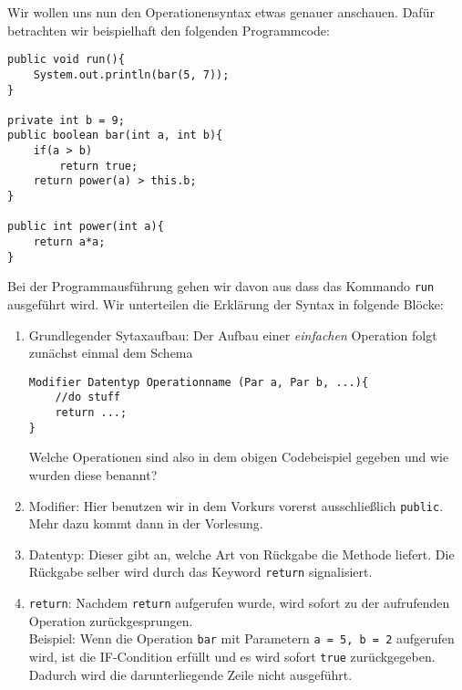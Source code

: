 \begin{Infobox}[Operationensyntax]
    Wir wollen uns nun den Operationensyntax etwas genauer anschauen. 
    Dafür betrachten wir beispielhaft den folgenden Programmcode:

    \begin{lstlisting}[breaklines=true, numbers=none]
public void run(){
    System.out.println(bar(5, 7));
}

private int b = 9;
public boolean bar(int a, int b){
    if(a > b)
        return true;
    return power(a) > this.b;
}

public int power(int a){
    return a*a;
}
    \end{lstlisting}

    Bei der Programmausführung gehen wir davon aus dass das Kommando \lstinline{run} ausgeführt wird. 
    Wir unterteilen die Erklärung der Syntax in folgende Blöcke:

    \begin{enumerate}[label=\roman*)]
        \item Grundlegender Sytaxaufbau: 
            Der Aufbau einer \textit{einfachen} Operation folgt zunächst einmal dem Schema 

            \begin{lstlisting}
Modifier Datentyp Operationname (Par a, Par b, ...){
    //do stuff
    return ...;
}
            \end{lstlisting}

            Welche Operationen sind also in dem obigen Codebeispiel gegeben und wie wurden diese benannt?
        \item Modifier: 
            Hier benutzen wir in dem Vorkurs vorerst ausschließlich \lstinline{public}. 
            Mehr dazu kommt dann in der Vorlesung.
        \item Datentyp: 
            Dieser gibt an, welche Art von Rückgabe die Methode liefert. 
            Die Rückgabe selber wird durch das Keyword \lstinline{return} signalisiert.
        \item \lstinline{return}:
            Nachdem \lstinline{return} aufgerufen wurde, wird sofort zu der aufrufenden Operation zurückgesprungen.\\
            Beispiel: Wenn die Operation \lstinline{bar} mit Parametern \lstinline{a = 5, b = 2} aufgerufen wird, ist die IF-Condition erfüllt und es wird sofort \lstinline{true} zurückgegeben.
            Dadurch wird die darunterliegende Zeile nicht ausgeführt.
    \end{enumerate}

\end{Infobox}


